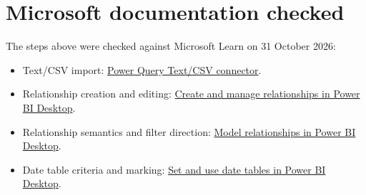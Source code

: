 \documentclass[11pt]{article}
\begin{document}
\section{Microsoft documentation checked}

The steps above were checked against Microsoft Learn on 31 October 2026:

\begin{itemize}
\item Text/CSV import: \href{https://learn.microsoft.com/en-us/power-query/connectors/text-csv}{Power Query Text/CSV connector}.
\item Relationship creation and editing: \href{https://learn.microsoft.com/en-us/power-bi/transform-model/desktop-create-and-manage-relationships}{Create and manage relationships in Power BI Desktop}.
\item Relationship semantics and filter direction: \href{https://learn.microsoft.com/en-us/power-bi/transform-model/desktop-relationships-understand}{Model relationships in Power BI Desktop}.
\item Date table criteria and marking: \href{https://learn.microsoft.com/en-us/power-bi/transform-model/desktop-date-tables}{Set and use date tables in Power BI Desktop}.
\end{itemize}
\end{document}
